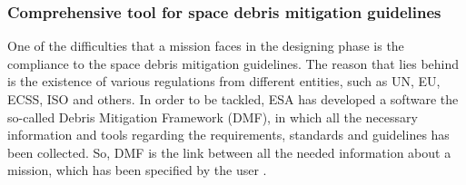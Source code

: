 
\bigskip
\subsubsection{Comprehensive tool for space debris mitigation guidelines}
\bigskip
One of the difficulties that a mission faces in the designing phase is the compliance to the space debris mitigation guidelines. The reason that lies behind is the existence of various regulations from different entities, such as UN, EU, ECSS, ISO and others. In order to be tackled, ESA has developed a software the so-called Debris Mitigation Framework (DMF), in which all the necessary information and tools regarding the requirements, standards and guidelines has been collected. So, DMF is the link between all the needed information about a mission, which has been specified by the user \cite{Braun}.

\bigskip
